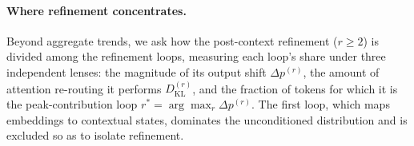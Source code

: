 \documentclass{llmxive}
\begin{document}
\paragraph{Where refinement concentrates.}
Beyond aggregate trends, we ask how the post-context refinement ($r \geq 2$) is
divided among the refinement loops, measuring each loop's share under three
independent lenses: the magnitude of its output shift $\Delta p^{(r)}$, the
amount of attention re-routing it performs $D_{\mathrm{KL}}^{(r)}$, and the
fraction of tokens for which it is the peak-contribution loop
$r^* = \arg\max_r \Delta p^{(r)}$.
The first loop, which maps embeddings to contextual states, dominates the
unconditioned distribution and is excluded so as to isolate refinement.
\end{document}
